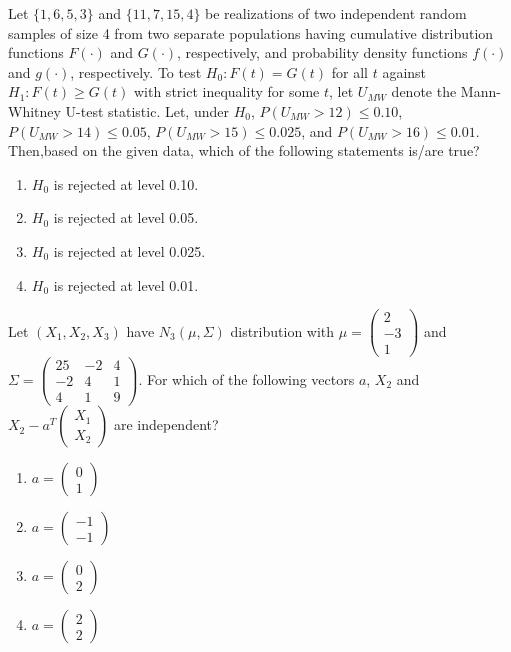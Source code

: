     \item Let $\{1, 6, 5, 3\}$ and $\{11, 7, 15, 4\}$ be realizations of two independent random samples of size 4 from two separate populations having cumulative distribution functions $F(\cdot)$ and $G(\cdot)$, respectively, and probability density functions $f(\cdot)$ and $g(\cdot)$, respectively. To test $H_0: F(t) = G(t)$ for all $t$ against $H_1: F(t) \geq G(t)$ with strict inequality for some $t$, let $U_{MW}$ denote the Mann-Whitney U-test statistic. Let, under $H_0$, $P(U_{MW} > 12) \leq 0.10$, $P(U_{MW} > 14) \leq 0.05$, $P(U_{MW} > 15) \leq 0.025$, and $P(U_{MW} > 16) \leq 0.01$. Then,based on the given data, which of the following statements is/are true?
    \begin{enumerate}
        \item $H_0$ is rejected at level 0.10.
        \item $H_0$ is rejected at level 0.05.
        \item $H_0$ is rejected at level 0.025.
        \item $H_0$ is rejected at level 0.01.
    \end{enumerate}
    \item Let $(X_1, X_2, X_3)$ have $N_3(\mu, \Sigma)$ distribution with $\mu = \begin{pmatrix} 2 \\ -3 \\ 1 \end{pmatrix}$ and $\Sigma = \begin{pmatrix} 25 & -2 & 4 \\ -2 & 4 & 1 \\ 4 & 1 & 9 \end{pmatrix}$. For which of the following vectors $a$, $X_2$ and $X_2 - a^T \begin{pmatrix} X_1 \\ X_2 \end{pmatrix}$ are independent?
    \begin{enumerate}
        \item $a = \begin{pmatrix}  0 \\ 1 \end{pmatrix}$
        \item $a = \begin{pmatrix}  -1 \\ -1 \end{pmatrix}$
        \item $a = \begin{pmatrix}  0 \\ 2 \end{pmatrix}$
        \item $a = \begin{pmatrix}  2 \\ 2 \end{pmatrix}$
    \end{enumerate}

